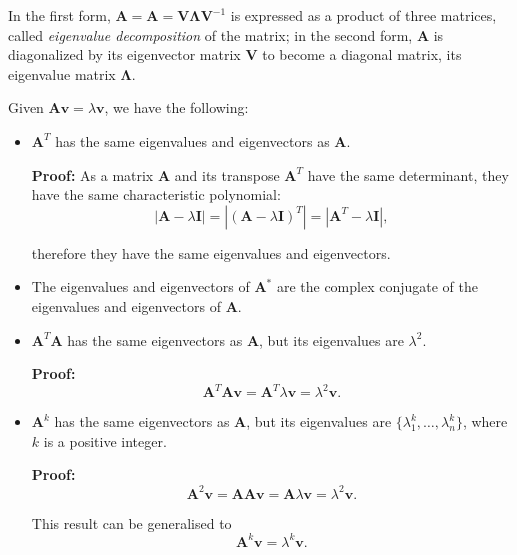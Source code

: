 \documentclass[10pt,b5paper,titlepage]{book}
\begin{document}
In the first form, $\mathbf{A} = \mathbf{A} = \mathbf{V}\mathbf{\Lambda{}}\mathbf{V}^{-1}$
is expressed as a product of three matrices, called \textit{eigenvalue decomposition}
of the matrix; in the second form, $\mathbf{A}$ is diagonalized by its eigenvector
matrix $\mathbf{V}$ to become a diagonal matrix, its eigenvalue matrix $\mathbf{\Lambda}$.

Given $\mathbf{A}\mathbf{v} = \lambda\mathbf{v}$, we have the following:
\begin{itemize}
\item $\mathbf{A}^{T}$ has the same eigenvalues and eigenvectors as $\mathbf{A}$.

\textbf{Proof:} As a matrix $\mathbf{A}$ and its transpose $\mathbf{A}^{T}$ have the same determinant, they have the same characteristic polynomial:
\begin{equation}
|\mathbf{A}-\lambda\mathbf{I}| = |(\mathbf{A}-\lambda\mathbf{I})^{T}| = |\mathbf{A}^{T}-\lambda\mathbf{I}|
,\end{equation}

therefore they have the same eigenvalues and eigenvectors.

\item The eigenvalues and eigenvectors of $\mathbf{A}^{*}$ are the complex conjugate of the eigenvalues and eigenvectors of $\mathbf{A}$.

\item $\mathbf{A}^{T}\mathbf{A}$ has the same eigenvectors as $\mathbf{A}$, but its eigenvalues are $\lambda^{2}$.

\textbf{Proof:}
\begin{equation}
\mathbf{A}^{T}\mathbf{A}\mathbf{v} = \mathbf{A}^{T}\lambda\mathbf{v} = \lambda^{2}\mathbf{v}
.\end{equation}


\item $\mathbf{A}^{k}$ has the same eigenvectors as $\mathbf{A}$, but its eigenvalues are $\{\lambda_{1}^{k},\dots,\lambda_{n}^{k}\}$, where $k$ is a positive integer.

\textbf{Proof:}
\begin{equation}
\mathbf{A}^{2}\mathbf{v} = \mathbf{A}\mathbf{A}\mathbf{v} = \mathbf{A}\lambda\mathbf{v} = \lambda^{2}\mathbf{v}
.\end{equation}

This result can be generalised to
\begin{equation}
\mathbf{A}^{k}\mathbf{v} = \lambda^{k}\mathbf{v}
.\end{equation}


\end{itemize}
\end{document}
